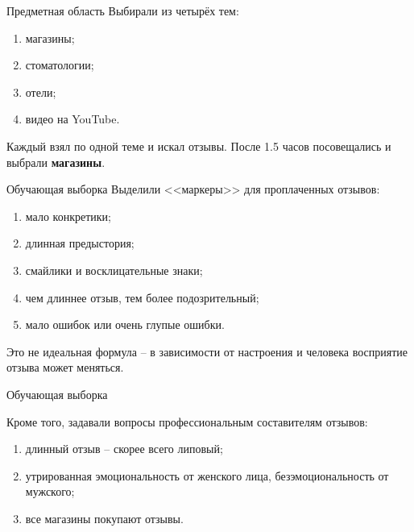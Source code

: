 \documentclass[mathserif,utf8,14pt]{beamer}
\begin{document}
\begin{frame}{Предметная область}
    Выбирали из четырёх тем:
    \begin{enumerate}
        \item магазины;
        \item стоматологии;
        \item отели;
        \item видео на YouTube.
    \end{enumerate}
    Каждый взял по одной теме и искал отзывы. После 1.5 часов посовещались
    и выбрали \textbf{магазины}.
\end{frame}

\begin{frame}{Обучающая выборка}
    Выделили <<маркеры>> для проплаченных отзывов:
    \begin{enumerate}
        \item мало конкретики;
        \item длинная предыстория;
        \item смайлики и восклицательные знаки;
        \item чем длиннее отзыв, тем более подозрительный;
        \item мало ошибок или очень глупые ошибки.
    \end{enumerate}
    Это не идеальная формула -- в зависимости от настроения и человека 
    восприятие отзыва может
    меняться. \\
\end{frame}

\begin{frame}{Обучающая выборка}
     \addtocounter{framenumber}{-1}
    Кроме того, задавали вопросы профессиональным составителям отзывов:
    \begin{enumerate}
        \item длинный отзыв -- скорее всего липовый;
        \item утрированная эмоциональность от женского лица, безэмоциональность
            от мужского;
        \item все магазины покупают отзывы. 
    \end{enumerate}
\end{frame}
\end{document}
